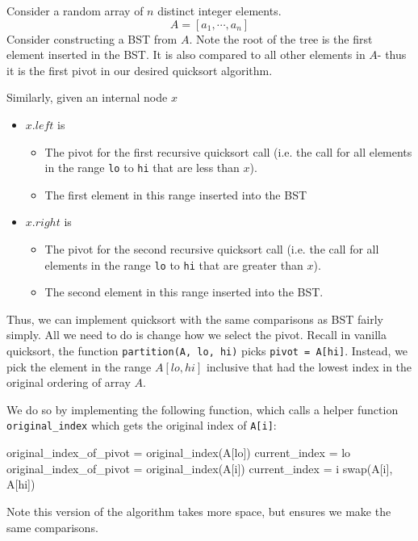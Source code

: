 \documentclass[paper=a4, fontsize=11pt]{scrartcl} %
\numberwithin{equation}{section} %
\numberwithin{figure}{section} %
\numberwithin{table}{section} %
\begin{document}
Consider a random array of $n$ distinct integer elements.
\[A = [a_1, \cdots, a_n]\]
Consider constructing a BST from $A$. Note the root of the tree is the first element inserted in the BST. It is also compared to all other elements in $A$- thus it is the first pivot in our desired quicksort algorithm. 

Similarly, given an internal node $x$
\begin{itemize}
\item $x.left$ is
\begin{itemize}
\item The pivot for the first recursive quicksort call (i.e. the call for all elements in the range \texttt{lo} to \texttt{hi} that are less than $x$).
\item The first element in this range inserted into the BST
\end{itemize}
\item $x.right$ is
\begin{itemize}
\item The pivot for the second recursive quicksort call (i.e. the call for all elements in the range \texttt{lo} to \texttt{hi} that are greater than $x$).
\item The second element in this range inserted into the BST.
\end{itemize}
\end{itemize}

Thus, we can implement quicksort with the same comparisons as BST fairly simply. All we need to do is change how we select the pivot. Recall in vanilla quicksort, the function \texttt{partition(A, lo, hi)} picks \texttt{pivot = A[hi]}. Instead, we pick the element in the range $A[lo, hi]$ inclusive that had the lowest index in the original ordering of  array $A$.

We do so by implementing the following function, which calls a helper function \texttt{original\_index} which gets the original index of \texttt{A[i]}:

\begin{algorithmic}
	\State original\_index\_of\_pivot = original\_index(A[lo])
	\State current\_index = lo
			\State original\_index\_of\_pivot = original\_index(A[i])
			\State current\_index = i
		\EndIf
	\EndFor
	\State swap(A[i], A[hi])
\EndFunction
\end{algorithmic}

Note this version of the algorithm takes more space, but ensures we make the same comparisons.
\end{document}
